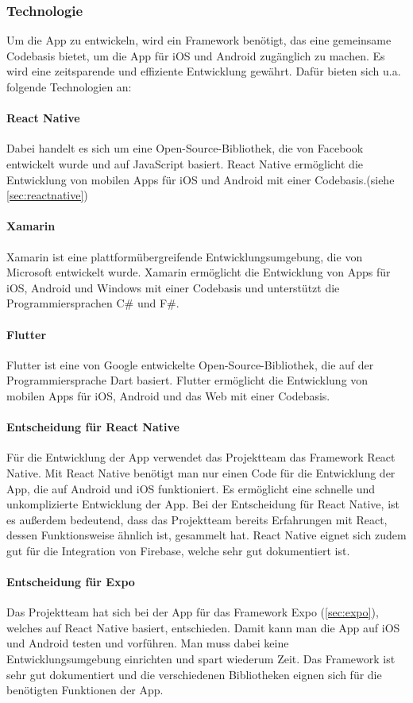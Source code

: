 \subsubsection{Technologie}
Um die App zu entwickeln, wird ein \Gls{Framework} benötigt, das eine gemeinsame Codebasis bietet, um die App für iOS und Android zugänglich zu machen. Es wird eine zeitsparende und effiziente Entwicklung gewährt. Dafür bieten sich u.a. folgende Technologien an:

\paragraph{React Native}
Dabei handelt es sich um eine \Gls{Open-Source}-Bibliothek, die von Facebook entwickelt wurde und auf JavaScript basiert. React Native ermöglicht die Entwicklung von mobilen Apps für iOS und Android mit einer Codebasis.(siehe \ref{sec:reactnative})

\paragraph{Xamarin}
Xamarin ist eine plattformübergreifende Entwicklungsumgebung, die von Microsoft entwickelt wurde. Xamarin ermöglicht die Entwicklung von Apps für iOS, Android und Windows mit einer Codebasis und unterstützt die Programmiersprachen C\# und F\#. 

\paragraph{Flutter}
Flutter ist eine von Google entwickelte \Gls{Open-Source}-Bibliothek, die auf der Programmiersprache Dart basiert. Flutter ermöglicht die Entwicklung von mobilen Apps für iOS, Android und das Web mit einer Codebasis. 

\paragraph{Entscheidung für React Native}
Für die Entwicklung der App verwendet das Projektteam das \Gls{Framework} React Native. Mit React Native benötigt man nur einen Code für die Entwicklung der App, die auf Android und iOS funktioniert. Es ermöglicht eine schnelle und unkomplizierte Entwicklung der App. Bei der Entscheidung für React Native, ist es außerdem bedeutend, dass das Projektteam bereits Erfahrungen mit React, dessen Funktionsweise ähnlich ist, gesammelt hat. React Native eignet sich zudem gut für die Integration von Firebase, welche sehr gut dokumentiert ist. 

\paragraph{Entscheidung für Expo}
\label{sec:entscheidungexpo}
Das Projektteam hat sich bei der App für das \Gls{Framework} Expo (\ref{sec:expo}), welches auf React Native basiert, entschieden. Damit kann man die App auf iOS und Android testen und vorführen. Man muss dabei keine Entwicklungsumgebung einrichten und spart wiederum Zeit. Das \Gls{Framework} ist sehr gut dokumentiert und die verschiedenen Bibliotheken eignen sich für die benötigten Funktionen der App.
